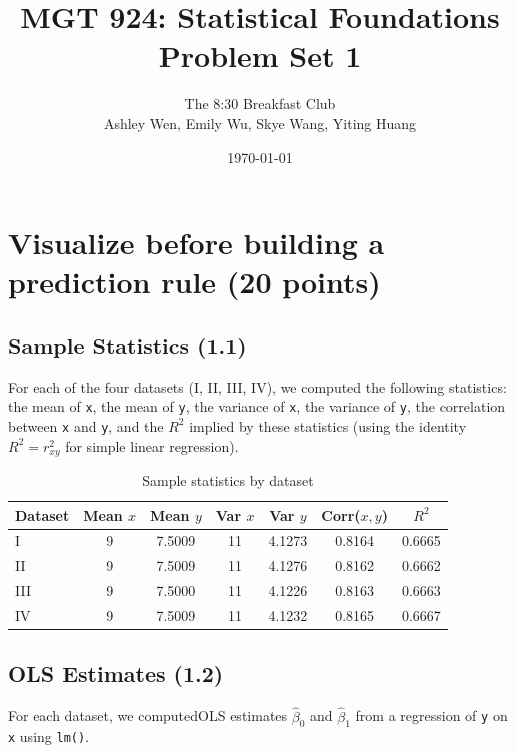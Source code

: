 \documentclass[11pt]{article}
\title{MGT 924: Statistical Foundations \\ Problem Set 1}
\author{
    The 8:30 Breakfast Club \\
    Ashley Wen, Emily Wu, Skye Wang, Yiting Huang
}
\date{\today}
\begin{document}
\maketitle

\section{Visualize before building a prediction rule (20 points)}

\subsection{Sample Statistics (1.1)}

For each of the four datasets (I, II, III, IV), we computed the following statistics: the mean of \texttt{x}, the mean of \texttt{y},
the variance of \texttt{x}, the variance of \texttt{y}, the correlation
between \texttt{x} and \texttt{y}, and the $R^2$ implied by these
statistics (using the identity $R^2 = r_{xy}^2$ for simple linear
regression).

\begin{table}[h]
\centering
\caption{Sample statistics by dataset}

\begin{tabular}{lcccccc}
\toprule
Dataset & Mean $x$ & Mean $y$ & Var $x$ & Var $y$ & Corr($x,y$) & $R^2$ \\
\midrule
I   & 9 & 7.5009 & 11 & 4.1273 & 0.8164 & 0.6665 \\
II  & 9 & 7.5009 & 11 & 4.1276 & 0.8162 & 0.6662 \\
III & 9 & 7.5000 & 11 & 4.1226 & 0.8163 & 0.6663 \\
IV  & 9 & 7.5009 & 11 & 4.1232 & 0.8165 & 0.6667 \\
\bottomrule
\end{tabular}

\end{table}

\subsection{OLS Estimates (1.2)}

For each dataset, we computedOLS estimates $\hat{\beta}_0$ and $\hat{\beta}_1$ from a regression of \texttt{y} on \texttt{x} using
\texttt{lm()}.
\end{document}
